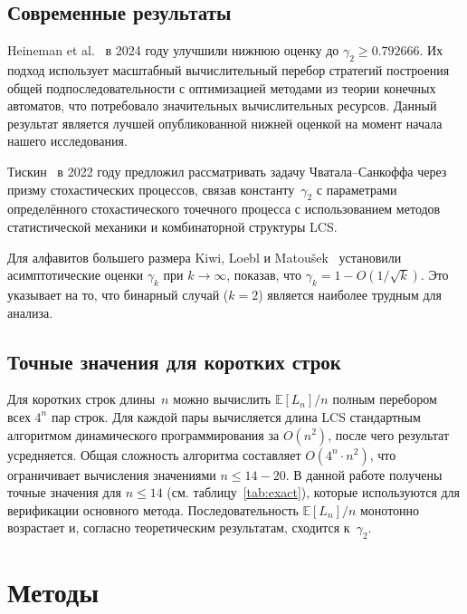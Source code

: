 \documentclass[12pt,a4paper]{article}
\begin{document}
\subsection{Современные результаты}

Heineman et al.~\cite{heineman2024} в 2024 году улучшили нижнюю оценку до $\gamma_2 \geq 0.792666$.
Их подход использует масштабный вычислительный перебор стратегий построения общей подпоследовательности с оптимизацией методами из теории конечных автоматов, что потребовало значительных вычислительных ресурсов.
Данный результат является лучшей опубликованной нижней оценкой на момент начала нашего исследования.

Тискин~\cite{tiskin2022} в 2022 году предложил рассматривать задачу Чватала--Санкоффа через призму стохастических процессов, связав константу~$\gamma_2$ с параметрами определённого стохастического точечного процесса с использованием методов статистической механики и комбинаторной структуры LCS.

Для алфавитов большего размера Kiwi, Loebl и Matou\v{s}ek~\cite{kiwi2005} установили асимптотические оценки $\gamma_k$ при $k \to \infty$, показав, что $\gamma_k = 1 - O(1/\sqrt{k})$.
Это указывает на то, что бинарный случай ($k = 2$) является наиболее трудным для анализа.

\subsection{Точные значения для коротких строк}

Для коротких строк длины~$n$ можно вычислить $\mathbb{E}[L_n]/n$ полным перебором всех $4^n$ пар строк.
Для каждой пары вычисляется длина LCS стандартным алгоритмом динамического программирования за $O(n^2)$, после чего результат усредняется.
Общая сложность алгоритма составляет $O(4^n \cdot n^2)$, что ограничивает вычисления значениями $n \leq 14{-}20$.
В данной работе получены точные значения для $n \leq 14$ (см. таблицу~\ref{tab:exact}), которые используются для верификации основного метода.
Последовательность $\mathbb{E}[L_n]/n$ монотонно возрастает и, согласно теоретическим результатам, сходится к~$\gamma_2$.

\section{Методы}
\end{document}
